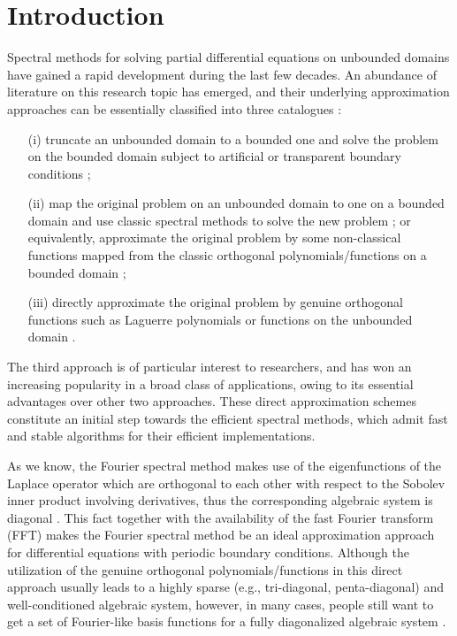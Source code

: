 \documentclass[10pt,reqno]{amsart}
\theoremstyle{remark}
\theoremstyle{definition}
\begin{document}
\section{Introduction}
Spectral methods for solving partial differential equations on unbounded domains
 have gained a rapid development
during  the last few decades.  An abundance  of literature on this research topic
has emerged, and their underlying  approximation approaches
can  be essentially classified into three catalogues  \cite{Boydbook,ShenWang}: 

\begin{itemize}
\item[(i)] truncate an unbounded domain to a bounded one and solve the problem on the bounded domain subject to  artificial or transparent boundary conditions \cite{NS,SW07};
\item[(ii)]  map the original problem on an unbounded domain  to  one on a bounded domain and use classic  spectral methods to solve the new problem \cite{G00}; or equivalently, approximate the  original problem  by  some  non-classical functions  mapped  from the classic orthogonal
polynomials/functions on a bounded domain \cite{Boyd87a,Boyd87b,Cris82,GSW00,GSW02,ShenWang,WG08,YG12};
\item[(iii)]  directly approximate the original problem by genuine   orthogonal functions such as  Laguerre polynomials or functions on the unbounded domain \cite{Coulaud,GS,GuoShenXu,GuoSunZhang,GWW,GuoZhang,GuoZhang1,IF,MaG,MPV,Shen,WGW,WX15,XG1,ZSX}.
\end{itemize}

The third approach is of particular interest to researchers, and has won an increasing popularity in a broad class of  applications, owing to its essential advantages over other two approaches.
These direct approximation schemes constitute an initial step
towards the efficient spectral methods,  which admit  fast and stable algorithms
for their efficient implementations.

As we know,
the Fourier spectral method makes use of
 the eigenfunctions of the Laplace operator which are orthogonal to each other with respect to the Sobolev inner product  involving derivatives, thus  the corresponding algebraic system is diagonal \cite{Boydbook,CHQZ06,STW}.
 This fact together with  the availability of the fast Fourier transform (FFT) makes
 the Fourier spectral method be an ideal approximation approach  for differential equations
 with periodic boundary conditions.
 Although the utilization of the genuine orthogonal polynomials/functions in this direct approach usually  leads to a highly sparse (e.g., tri-diagonal, penta-diagonal) and well-conditioned algebraic system, however, in many cases, people still want to get
a set of Fourier-like basis functions for a fully diagonalized algebraic system \cite{ShenWang07}.
\end{document}

